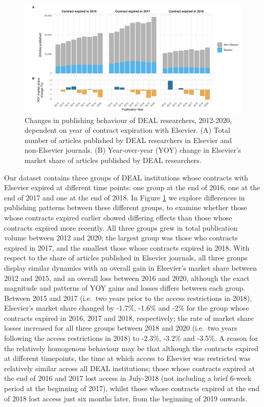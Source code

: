 \documentclass[
]{article}
\begin{document}
\begin{figure}
\centering
\includegraphics{analysis_files/figure-latex/items-publisher-year-cancellation-1.pdf}
\caption{\label{fig:items-publisher-year-cancellation}Changes in publishing behaviour of DEAL researchers, 2012-2020, dependent on year of contract expiration with Elsevier. (A) Total number of articles published by DEAL researchers in Elsevier and non-Elsevier journals. (B) Year-over-year (YOY) change in Elsevier's market share of articles published by DEAL researchers.}
\end{figure}

Our dataset contains three groups of DEAL institutions whose contracts with Elsevier expired at different time points: one group at the end of 2016, one at the end of 2017 and one at the end of 2018. In Figure \ref{fig:items-publisher-year-cancellation} we explore differences in publishing patterns between these different groups, to examine whether those whose contracts expired earlier showed differing effects than those whose contracts expired more recently. All three groups grew in total publication volume between 2012 and 2020; the largest group was those who contracts expired in 2017, and the smallest those whose contracts expired in 2018. With respect to the share of articles published in Elsevier journals, all three groups display similar dynamics with an overall gain in Elsevier's market share between 2012 and 2015, and an overall loss between 2016 and 2020, although the exact magnitude and patterns of YOY gains and losses differs between each group. Between 2015 and 2017 (i.e.~two years prior to the access restrictions in 2018), Elsevier's market share changed by -1.7\%, -1.6\% and -2\% for the group whose contracts expired in 2016, 2017 and 2018, respectively; the rate of market share losses increased for all three groups between 2018 and 2020 (i.e.~two years following the access restrictions in 2018) to -2.3\%, -3.2\% and -3.5\%. A reason for the relatively homogenous behaviour may be that although the contracts expired at different timepoints, the time at which access to Elsevier was restricted was relatively similar across all DEAL institutions; those whose contracts expired at the end of 2016 and 2017 lost access in July-2018 (not including a brief 6-week period at the beginning of 2017), whilst those whose contracts expired at the end of 2018 lost access just six months later, from the beginning of 2019 onwards.
\end{document}
